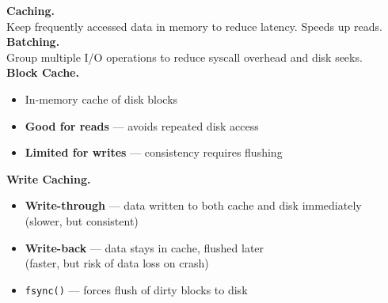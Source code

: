 \documentclass[8pt]{extarticle}
\begin{document}
\noindent\textbf{Caching.} \\
Keep frequently accessed data in memory to reduce latency. Speeds up reads.\\
\noindent\textbf{Batching.} \\
Group multiple I/O operations to reduce syscall overhead and disk seeks.\\
\noindent\textbf{Block Cache.}
\begin{itemize}[noitemsep,nolistsep,topsep=0px,partopsep=0pt,parsep=0pt]  
    \item In-memory cache of disk blocks
    \item \textbf{Good for reads} — avoids repeated disk access
    \item \textbf{Limited for writes} — consistency requires flushing
\end{itemize}
\noindent\textbf{Write Caching.}
\begin{itemize}[noitemsep,nolistsep,topsep=0px,partopsep=0pt,parsep=0pt]  
    \item \textbf{Write-through} — data written to both cache and disk immediately\\
          (slower, but consistent)
    \item \textbf{Write-back} — data stays in cache, flushed later\\
          (faster, but risk of data loss on crash)
    \item \texttt{fsync()} — forces flush of dirty blocks to disk
\end{itemize}
\end{document}
